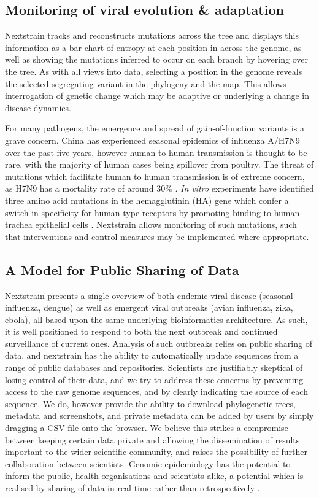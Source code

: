 \documentclass{bioinfo}
\begin{document}
\subsection*{Monitoring of viral evolution \& adaptation}
Nextstrain tracks and reconstructs mutations across the tree and displays this information as a bar-chart of entropy at each position in across the genome, as well as showing the mutations inferred to occur on each branch by hovering over the tree.
As with all views into data, selecting a position in the genome reveals the selected segregating variant in the phylogeny and the map.
This allows interrogation of genetic change which may be adaptive or underlying a change in disease dynamics.

For many pathogens, the emergence and spread of gain-of-function variants is a grave concern.
China has experienced seasonal epidemics of influenza A/H7N9 over the past five years, however human to human transmission is thought to be rare, with the majority of human cases being spillover from poultry.
The threat of mutations which facilitate human to human transmission is of extreme concern, as H7N9 has a mortality rate of around $30\%$ \citep{li2014epidemiology}.
\textit{In vitro} experiments have identified three amino acid mutations in the hemagglutinin (HA) gene which confer a switch in specificity for human-type receptors by promoting binding to human trachea epithelial cells \citep{devries2017three}.
Nextstrain allows monitoring of such mutations, such that interventions and control measures may be implemented where appropriate.


\subsection*{A Model for Public Sharing of Data}
Nextstrain presents a single overview of both endemic viral disease (seasonal influenza, dengue) as well as emergent viral outbreaks (avian influenza, zika, ebola), all based upon the same underlying bioinformatics architecture.
As such, it is well positioned to respond to both the next outbreak and continued surveillance of current ones.
Analysis of such outbreaks relies on public sharing of data, and nextstrain has the ability to automatically update sequences from a range of public databases and repositories.
Scientists are justifiably skeptical of losing control of their data, and we try to address these concerns by preventing access to the raw genome sequences, and by clearly indicating the source of each sequence.
We do, however provide the ability to download phylogenetic trees, metadata and screenshots, and private metadata can be added by users by simply dragging a CSV file onto the browser.
We believe this strikes a compromise between keeping certain data private and allowing the dissemination of results important to the wider scientific community, and raises the possibility of further collaboration between scientists.
Genomic epidemiology has the potential to inform the public, health organisations and scientists alike, a potential which is realised by sharing of data in real time rather than retrospectively \citep{croucher2015application}.
\end{document}
